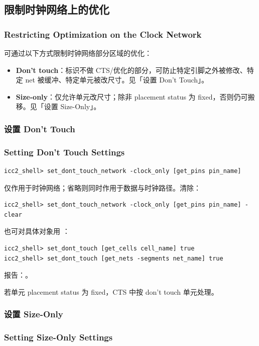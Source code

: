 \subsection{限制时钟网络上的优化}
\subsubsection*{Restricting Optimization on the Clock Network}

可通过以下方式限制时钟网络部分区域的优化：
\begin{itemize}
  \item \textbf{Don't touch}：标识不做 CTS/优化的部分，可防止特定引脚之外被修改、特定 net 被缓冲、特定单元被改尺寸。见「设置 Don't Touch」。
  \item \textbf{Size-only}：仅允许单元改尺寸；除非 placement status 为 fixed，否则仍可搬移。见「设置 Size-Only」。
\end{itemize}

\subsubsection{设置 Don't Touch}
\subsubsection*{Setting Don't Touch Settings}

\begin{lstlisting}
icc2_shell> set_dont_touch_network -clock_only [get_pins pin_name]
\end{lstlisting}
 仅作用于时钟网络；省略则同时作用于数据与时钟路径。清除：
\begin{lstlisting}
icc2_shell> set_dont_touch_network -clock_only [get_pins pin_name] -clear
\end{lstlisting}
也可对具体对象用 ：
\begin{lstlisting}
icc2_shell> set_dont_touch [get_cells cell_name] true
icc2_shell> set_dont_touch [get_nets -segments net_name] true
\end{lstlisting}
报告：。
\begin{noteBox}
若单元 placement status 为 fixed，CTS 中按 don't touch 单元处理。
\end{noteBox}

\subsubsection{设置 Size-Only}
\subsubsection*{Setting Size-Only Settings}

